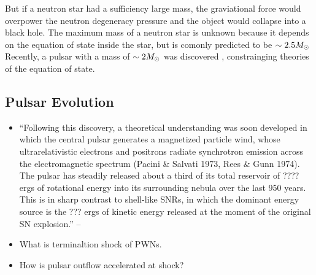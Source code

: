 But if a neutron star had a sufficiency large mass, the graviational
force would overpower the neutron degeneracy pressure and the
object would collapse into a black hole. The maximum mass of a
neutron star is unknown because it depends on the equation of state
inside the star, but is comonly predicted to be $\sim 2.5M_{\odot}$
Recently, a pulsar with a mass of $\sim 2M_{\odot}$ was discovered
\citep{demorest_2010_two-solar-mass-neutron}, constrainging
theories of the equation of state.




\subsection{Pulsar Evolution}








\begin{itemize}
  \item ``Following this discovery, a theoretical understanding was
  soon developed in which the central pulsar generates a magnetized
  particle wind, whose ultrarelativistic electrons and positrons radiate
  synchrotron emission across the electromagnetic spectrum (Pacini \&
  Salvati 1973, Rees \& Gunn 1974). The pulsar has steadily released
  about a third of its total reservoir of ???? ergs
  of rotational energy into its surrounding nebula over the last 950
  years. This is in sharp contrast to shell-like SNRs, in which the
  dominant energy source is the ??? ergs of kinetic energy
  released at the moment of the original SN explosion.''  -- \cite{gaensler_2006_evolution-structure}
  \item 
    What is terminaltion shock of \glspl{PWN}.
  \item 
    How is pulsar outflow accelerated at shock?
\end{itemize}



